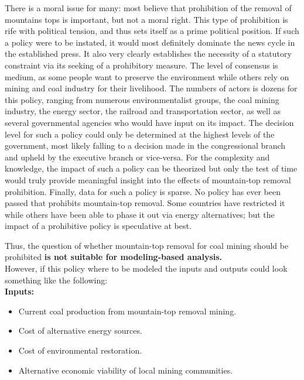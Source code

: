 \documentclass[journal, onecolumn, 12pt]{IEEEtran}
\begin{document}
There is a moral issue for many: most believe that prohibition of the removal of mountains tops is important, but not a moral right. This type of prohibition is rife with political tension, and thus sets itself as a prime political position. If such a policy were to be instated, it would most definitely dominate the news cycle in the established press. It also very clearly establishes the necessity of a statutory constraint via its seeking of a prohibitory measure. The level of consensus is medium, as some people want to preserve the environment while others rely on mining and coal industry for their livelihood. The numbers of actors is dozens for this policy, ranging from numerous environmentalist groups, the coal mining industry, the energy sector, the railroad and transportation sector, as well as several governmental agencies who would have input on its impact. The decision level for such a policy could only be determined at the highest levels of the government, most likely falling to a decision made in the congressional branch and upheld by the executive branch or vice-versa. For the complexity and knowledge, the impact of such a policy can be theorized but only the test of time would truly provide meaningful insight into the effects of mountain-top removal prohibition. Finally, data for such a policy is sparse. No policy has ever been passed that prohibits mountain-top removal. Some countries have restricted it while others have been able to phase it out via energy alternatives; but the impact of a prohibitive policy is speculative at best. \par
Thus, the question of whether mountain-top removal for coal mining should be prohibited \textbf{is not suitable for modeling-based analysis.} \\

However, if this policy where to be modeled the inputs and outputs could look something like the following: \\

\textbf{Inputs:}
\begin{itemize}
    \item Current coal production from mountain-top removal mining. 
    \item Cost of alternative energy sources.
    \item Cost of environmental restoration. 
    \item Alternative economic viability of local mining communities. \\
    
\end{itemize}
\end{document}
